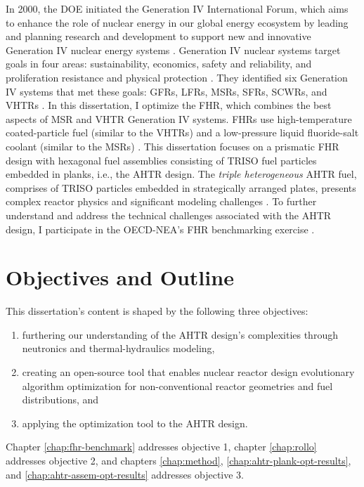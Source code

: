In 2000, the \gls{DOE} initiated the Generation IV International Forum, which aims 
to enhance the role of nuclear energy in our global energy ecosystem by 
leading and planning research and development to support new and innovative 
Generation IV nuclear energy systems \cite{gif_technology_2002}.
Generation IV nuclear systems target goals in four areas: sustainability, 
economics, safety and reliability, and proliferation resistance and physical 
protection \cite{gif_technology_2002}. 
They identified six Generation IV systems that met these goals: \glspl{GFR}, 
\glspl{LFR}, \glspl{MSR}, \glspl{SFR}, \glspl{SCWR}, and \glspl{VHTR} 
\cite{gif_technology_2002}. 
In this dissertation, I optimize the \gls{FHR}, which combines the best aspects 
of \gls{MSR} and \gls{VHTR} Generation IV systems. 
\glspl{FHR} use high-temperature coated-particle fuel (similar to the \glspl{VHTR}) 
and a low-pressure liquid fluoride-salt coolant (similar to the \glspl{MSR})
\cite{forsberg_fluoride-salt-cooled_2012,facilitators_fluoride-salt-cooled_2013}.
This dissertation focuses on a prismatic \gls{FHR} design with hexagonal fuel 
assemblies consisting of \gls{TRISO} fuel particles embedded in planks, i.e., 
the \gls{AHTR} design.
The \emph{triple heterogeneous} \gls{AHTR} fuel, comprises of \gls{TRISO} 
particles embedded in strategically arranged plates, presents complex reactor 
physics and significant modeling challenges \cite{petrovic_benchmark_2021}. 
To further understand and address the technical challenges associated with the 
\gls{AHTR} design, I participate in the \gls{OECD}-\gls{NEA}'s \gls{FHR} 
benchmarking exercise \cite{petrovic_benchmark_2021}.

\section{Objectives and Outline}
This dissertation's content is shaped by the following three objectives: 
\begin{enumerate}
    \item furthering our understanding of the \gls{AHTR} design's complexities 
    through neutronics and thermal-hydraulics modeling, 
    \item creating an open-source tool that enables nuclear reactor design 
    evolutionary algorithm optimization for non-conventional reactor geometries and fuel 
    distributions, and 
    \item applying the optimization tool to the \gls{AHTR} design. 
\end{enumerate}
Chapter \ref{chap:fhr-benchmark} addresses objective 1, chapter \ref{chap:rollo} 
addresses objective 2, and chapters \ref{chap:method}, \ref{chap:ahtr-plank-opt-results}, 
and \ref{chap:ahtr-assem-opt-results} addresses objective 3. 

